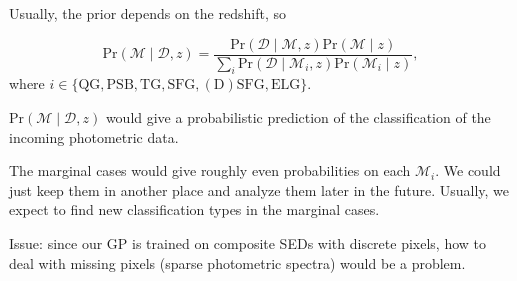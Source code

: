 \documentclass[12pt,letterpaper]{article}
\newcommand{\mt}{\mathrm}
\begin{document}
Usually, the prior depends on the redshift, so

\begin{equation}
    \mt{Pr}(\mathcal{M} \mid \mathcal{D}, z) = 
    \frac{ 
        \mt{Pr}(\mathcal{D} \mid \mathcal{M}, z)\mt{Pr}(\mathcal{M} \mid z)
        }{ 
        \sum_i \mt{Pr}(\mathcal{D} \mid \mathcal{M}_i, z) \mt{Pr}(\mathcal{M}_i \mid z) 
    },
\end{equation}
where $ i \in { \mt{ \{QG, PSB, TG, SFG, (D)SFG, ELG\} } } $.


$\mt{Pr}(\mathcal{M} \mid \mathcal{D}, z)$ would give a probabilistic 
prediction of the classification of the incoming photometric data.

The marginal cases would give roughly even probabilities on each $\mathcal{M}_i$. 
We could just keep them in another place and analyze them later in the future. 
Usually, we expect to find new classification types in the marginal cases.

Issue: since our GP is trained on composite SEDs with discrete pixels, how to deal with missing 
pixels (sparse photometric spectra) would be a problem. 
\end{document}
